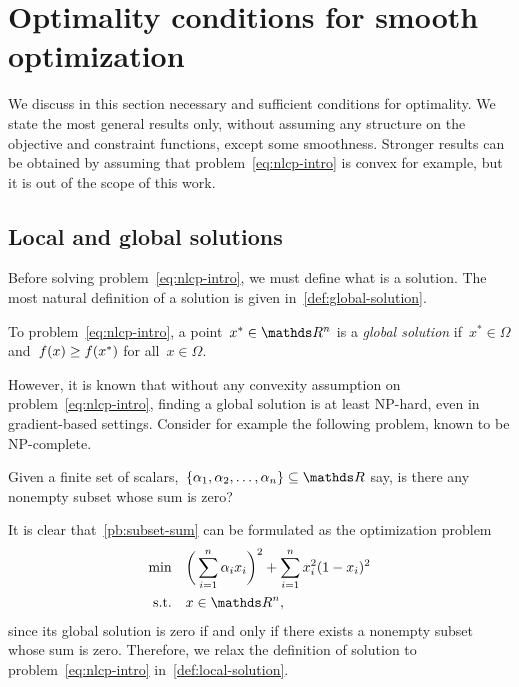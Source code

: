 \section{Optimality conditions for smooth optimization}

We discuss in this section necessary and sufficient conditions for optimality.
We state the most general results only, without assuming any structure on the objective and constraint functions, except some smoothness.
Stronger results can be obtained by assuming that problem~\cref{eq:nlcp-intro} is convex for example, but it is out of the scope of this work.

\subsection{Local and global solutions}

Before solving problem~\cref{eq:nlcp-intro}, we must define what is a solution.
The most natural definition of a solution is given in~\cref{def:global-solution}.

\begin{definition}
    \label{def:global-solution}
    To problem~\cref{eq:nlcp-intro}, a point~$x^{\ast} \in \R^n$ is a \emph{global solution} if~$x^{\ast} \in \Omega$ and~$f(x) \ge f(x^{\ast})$ for all~$x \in \Omega$.
\end{definition}

However, it is known that without any convexity assumption on problem~\cref{eq:nlcp-intro}, finding a global solution is at least NP-hard, even in gradient-based settings.
Consider for example the following problem, known to be NP-complete.

\begin{problem}
    \label{pb:subset-sum}
    Given a finite set of scalars,~$\set{\alpha_1, \alpha_2, \dots, \alpha_n} \subseteq \R$ say, is there any nonempty subset whose sum is zero?
\end{problem}

It is clear that~\cref{pb:subset-sum} can be formulated as the optimization problem
\begin{equation*}
    \begin{aligned}
        \min        & \quad \bigg( \sum_{i = 1}^n \alpha_i x_i \bigg)^2 + \sum_{i = 1}^n x_i^2 (1 - x_i)^2\\
        \text{s.t.} & \quad x \in \R^n,
    \end{aligned}
\end{equation*}
since its global solution is zero if and only if there exists a nonempty subset whose sum is zero.
Therefore, we relax the definition of solution to problem~\cref{eq:nlcp-intro} in~\cref{def:local-solution}.

